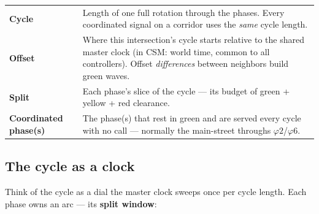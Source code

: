 \documentclass[11pt]{article}
\newcommand{\ph}[1]{\ensuremath{\varphi#1}}
\begin{document}
\begin{center}\small
\begin{tabular}{@{}lp{11.4cm}@{}}
\toprule
\textbf{Cycle} & Length of one full rotation through the phases. Every coordinated
                 signal on a corridor uses the \emph{same} cycle length. \\
\textbf{Offset} & Where this intersection's cycle starts relative to the shared
                  master clock (in CSM: world time, common to all controllers).
                  Offset \emph{differences} between neighbors build green waves. \\
\textbf{Split}  & Each phase's slice of the cycle — its budget of green + yellow +
                  red clearance. \\
\textbf{Coordinated phase(s)} & The phase(s) that rest in green and are served every
                  cycle with no call — normally the main-street throughs \ph{2}/\ph{6}. \\
\bottomrule
\end{tabular}
\end{center}

\subsection{The cycle as a clock}\label{sec:clock}

Think of the cycle as a dial the master clock sweeps once per cycle length. Each
phase owns an arc — its \textbf{split window}:
\end{document}
